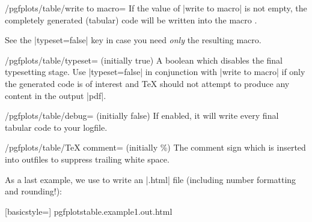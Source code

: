 \documentclass[a4paper]{ltxdoc}
\begin{document}

\begin{key}{/pgfplots/table/write to macro=}
    If the value of |write to macro| is not empty, the completely generated
    (tabular) code will be written into the macro .

    See the |typeset=false| key in case you need \emph{only} the resulting
    macro.
\end{key}


\begin{key}{/pgfplots/table/typeset= (initially true)}
    A boolean which disables the final typesetting stage. Use |typeset=false|
    in conjunction with |write to macro| if only the generated code is of
    interest and \TeX{} should not attempt to produce any content in the output
    |pdf|.
\end{key}

\begin{key}{/pgfplots/table/debug= (initially false)}
    If enabled, it will write every final tabular code to your logfile.
\end{key}

\begin{key}{/pgfplots/table/TeX comment= (initially \%)}
    The comment sign which is inserted into outfiles to suppress trailing white
    space.
\end{key}

\noindent As a last example, we use \PGFPlotstable{} to write an |.html| file
(including number formatting and rounding!):
%
\begin{codeexample}[width=8cm]

    [basicstyle=\ttfamily\footnotesize]
    {pgfplotstable.example1.out.html}
\end{codeexample}
\end{document}
